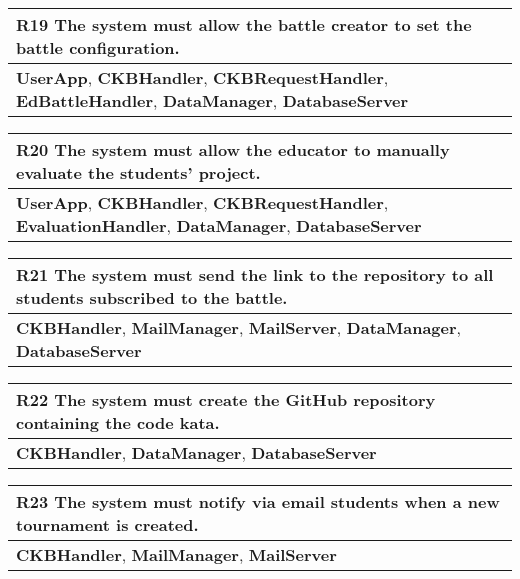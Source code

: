 \begin{table}[H]
    \begin{tabularx}{\textwidth}{X}
        \toprule
        \textbf{R19} The system must allow the battle creator to set the battle configuration. \\ \midrule
        \textbf{UserApp}, \textbf{CKBHandler}, \textbf{CKBRequestHandler}, \textbf{EdBattleHandler}, \textbf{DataManager}, \textbf{DatabaseServer}                    \\
    \end{tabularx}
\end{table}

\begin{table}[H]
    \begin{tabularx}{\textwidth}{X}
        \toprule
        \textbf{R20} The system must allow the educator to manually evaluate the students' project. \\ \midrule
        \textbf{UserApp}, \textbf{CKBHandler}, \textbf{CKBRequestHandler}, \textbf{EvaluationHandler}, \textbf{DataManager}, \textbf{DatabaseServer} \\
        \end{tabularx}
\end{table}

\begin{table}[H]
    \begin{tabularx}{\textwidth}{X}
        \toprule
        \textbf{R21} The system must send the link to the repository to all students subscribed to the battle.\\ \midrule
        \textbf{CKBHandler}, \textbf{MailManager}, \textbf{MailServer}, \textbf{DataManager}, \textbf{DatabaseServer} \\
    \end{tabularx}
\end{table}

\begin{table}[H]
    \begin{tabularx}{\textwidth}{X}
        \toprule
        \textbf{R22} The system must create the GitHub repository containing the code kata. \\ \midrule
        \textbf{CKBHandler}, \textbf{DataManager}, \textbf{DatabaseServer}                   \\
    \end{tabularx}
\end{table}

\begin{table}[H]
    \begin{tabularx}{\textwidth}{X}
        \toprule
        \textbf{R23} The system must notify via email students when a new tournament is created. \\ \midrule
        \textbf{CKBHandler}, \textbf{MailManager}, \textbf{MailServer} \\
    \end{tabularx}
\end{table}

